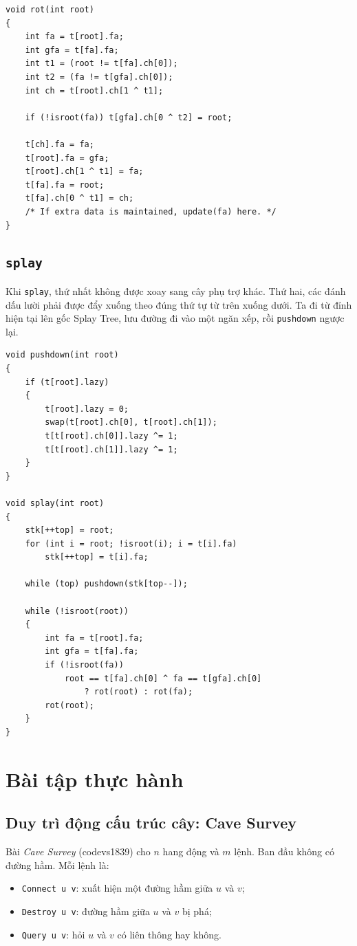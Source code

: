 \documentclass[11pt]{article}
\begin{document}
\begingroup
\small
\begin{verbatim}
void rot(int root)
{
    int fa = t[root].fa;
    int gfa = t[fa].fa;
    int t1 = (root != t[fa].ch[0]);
    int t2 = (fa != t[gfa].ch[0]);
    int ch = t[root].ch[1 ^ t1];

    if (!isroot(fa)) t[gfa].ch[0 ^ t2] = root;

    t[ch].fa = fa;
    t[root].fa = gfa;
    t[root].ch[1 ^ t1] = fa;
    t[fa].fa = root;
    t[fa].ch[0 ^ t1] = ch;
    /* If extra data is maintained, update(fa) here. */
}
\end{verbatim}
\endgroup

\subsection{\texttt{splay}}

Khi \texttt{splay}, thứ nhất không được xoay sang cây phụ trợ khác.  Thứ hai,
các đánh dấu lười phải được đẩy xuống theo đúng thứ tự từ trên xuống dưới.  Ta
đi từ đỉnh hiện tại lên gốc Splay Tree, lưu đường đi vào một ngăn xếp, rồi
\texttt{pushdown} ngược lại.

\begingroup
\small
\begin{verbatim}
void pushdown(int root)
{
    if (t[root].lazy)
    {
        t[root].lazy = 0;
        swap(t[root].ch[0], t[root].ch[1]);
        t[t[root].ch[0]].lazy ^= 1;
        t[t[root].ch[1]].lazy ^= 1;
    }
}

void splay(int root)
{
    stk[++top] = root;
    for (int i = root; !isroot(i); i = t[i].fa)
        stk[++top] = t[i].fa;

    while (top) pushdown(stk[top--]);

    while (!isroot(root))
    {
        int fa = t[root].fa;
        int gfa = t[fa].fa;
        if (!isroot(fa))
            root == t[fa].ch[0] ^ fa == t[gfa].ch[0]
                ? rot(root) : rot(fa);
        rot(root);
    }
}
\end{verbatim}
\endgroup

\section{Bài tập thực hành}

\subsection{Duy trì động cấu trúc cây: Cave Survey}

Bài \textit{Cave Survey} (codevs1839) cho $n$ hang động và $m$ lệnh.  Ban đầu
không có đường hầm.  Mỗi lệnh là:
\begin{itemize}
  \item \texttt{Connect u v}: xuất hiện một đường hầm giữa $u$ và $v$;
  \item \texttt{Destroy u v}: đường hầm giữa $u$ và $v$ bị phá;
  \item \texttt{Query u v}: hỏi $u$ và $v$ có liên thông hay không.
\end{itemize}
\end{document}
